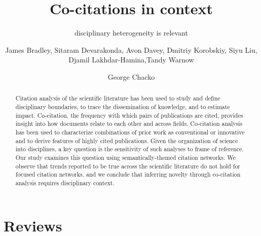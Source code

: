 \documentclass[NETN]{stjour}
\begin{document}
\title[Co-citations in context]{Co-citations in context}
\subtitle{disciplinary heterogeneity is relevant}



\author[Author Names]
{James Bradley,
Sitaram Devarakonda, Avon Davey, Dmitriy Korobskiy, Siyu Liu, Djamil Lakhdar-Hamina,Tandy Warnow
\and George Chacko}



\begin{abstract}
Citation analysis of the scientific literature has been used to study and define disciplinary boundaries, to trace the dissemination of knowledge, and to estimate impact. Co-citation, the frequency with which pairs of publications are cited, provides insight into how documents relate to each other and across fields. Co-citation analysis has been used to characterize combinations of prior work as conventional or innovative and to derive features of highly cited publications. Given the organization of science into disciplines, a key question is the sensitivity of such analyses to frame of reference. Our study examines this question using  semantically-themed citation networks. We observe that trends reported to be true across the scientific literature do not hold for focused citation networks, and we conclude that inferring novelty through co-citation analysis requires disciplinary context.
\end{abstract}

\section{Reviews}
\end{document}
